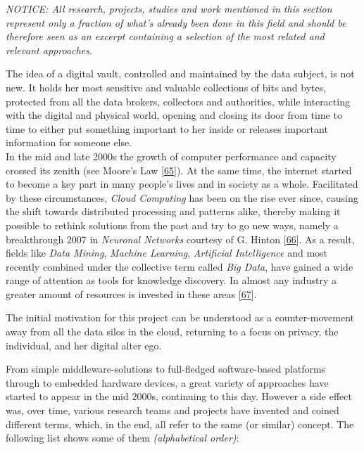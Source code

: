 \documentclass[12pt,english,a4paper,titlepage,cleardoublepage=empty,dottedtoc]{report}
\begin{document}
\emph{NOTICE: All research, projects, studies and work mentioned in this
section represent only a fraction of what's already been done in this
field and should be therefore seen as an excerpt containing a selection
of the most related and relevant approaches.}

The idea of a digital vault, controlled and maintained by the data
subject, is not new. It holds her most sensitive and valuable
collections of bits and bytes, protected from all the data brokers,
collectors and authorities, while interacting with the digital and
physical world, opening and closing its door from time to time to either
put something important to her inside or releases important information
for someone else.\\
In the mid and late 2000s the growth of computer performance and
capacity crossed its zenith (see Moore's Law
{[}\protect\hyperlink{ref-paper_1965_moors-law}{65}{]}). At the same
time, the internet started to become a key part in many people's lives
and in society as a whole. Facilitated by these circumstances,
\emph{Cloud Computing} has been on the rise ever since, causing the
shift towards distributed processing and patterns alike, thereby making
it possible to rethink solutions from the past and try to go new ways,
namely a breakthrough 2007 in \emph{Neuronal Networks} courtesy of G.
Hinton
{[}\protect\hyperlink{ref-podcast_2015_cre-neuronale-netze}{66}{]}. As a
result, fields like \emph{Data Mining}, \emph{Machine Learning},
\emph{Artificial Intelligence} and most recently combined under the
collective term called \emph{Big Data}, have gained a wide range of
attention as tools for knowledge discovery. In almost any industry a
greater amount of resources is invested in these areas
{[}\protect\hyperlink{ref-web_2016_industries-intention-to-invest-in-big-data}{67}{]}.

The initial motivation for this project can be understood as a
counter-movement away from all the data silos in the cloud, returning to
a focus on privacy, the individual, and her digital alter ego.

From simple middleware-solutions to full-fledged software-based
platforms through to embedded hardware devices, a great variety of
approaches have started to appear in the mid 2000s, continuing to this
day. However a side effect was, over time, various research teams and
projects have invented and coined different terms, which, in the end,
all refer to the same (or similar) concept. The following list shows
some of them \emph{(alphabetical order)}:
\end{document}
